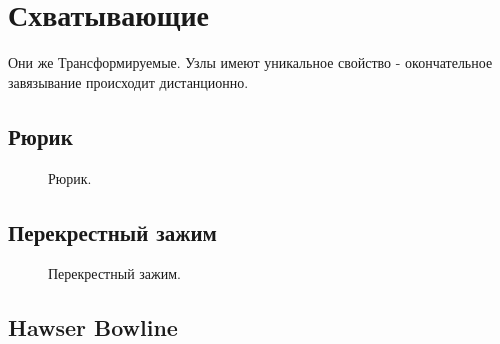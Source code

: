 \section{Схватывающие}\label{transformers}

Они же Трансформируемые. Узлы имеют уникальное свойство - окончательное завязывание происходит дистанционно.

\subsection{Рюрик}


\begin{figure}[H]\centering
	\begin{minipage}{1\linewidth}
		\begin{center}
			\tcbox[enhanced jigsaw,colframe=black,opacityframe=0.5,opacityback=0.5]
			{\centering{}}
		\end{center}
	\end{minipage}
\caption{Рюрик.}
\label{ris:Rurik}
\end{figure}

\subsection{Перекрестный зажим}


\begin{figure}[H]\centering
	\begin{minipage}{1\linewidth}
		\begin{center}
			\tcbox[enhanced jigsaw,colframe=black,opacityframe=0.5,opacityback=0.5]
			{\centering{}}
		\end{center}
	\end{minipage}
\caption{Перекрестный зажим.}
\label{ris:Perekrestny_zazhim}
\end{figure}

\subsection{Hawser Bowline}

\begin{figure}[H]\centering
	\subfloat[Завязывание]{\label{ris:Hawser_Bowline_1}
	\tcbox[enhanced jigsaw,colframe=black,opacityframe=0.5,opacityback=0.5]
		{\centering
			}
		}
\hfil
	\subfloat[Фиксирование]{\label{ris:Hawser_Bowline_2}
	\tcbox[enhanced jigsaw,colframe=black,opacityframe=0.5,opacityback=0.5]
		{\centering
			}
		}
\end{figure}

